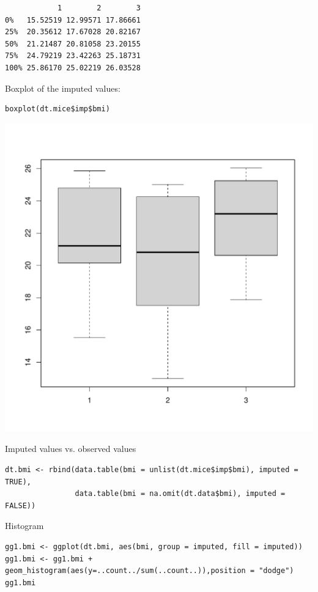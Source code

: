 \documentclass[12pt]{article}
\begin{document}
\begin{verbatim}
            1        2        3
0%   15.52519 12.99571 17.86661
25%  20.35612 17.67028 20.82167
50%  21.21487 20.81058 23.20155
75%  24.79219 23.42263 25.18731
100% 25.86170 25.02219 26.03528
\end{verbatim}

Boxplot of the imputed values:

\lstset{language=r,label= ,caption= ,captionpos=b,numbers=none}
\begin{lstlisting}
boxplot(dt.mice$imp$bmi)
\end{lstlisting}

\begin{center}
\includegraphics[width=.9\linewidth]{./boxplotImputed.pdf}
\end{center}

Imputed values vs. observed values
\lstset{language=r,label= ,caption= ,captionpos=b,numbers=none}
\begin{lstlisting}
dt.bmi <- rbind(data.table(bmi = unlist(dt.mice$imp$bmi), imputed = TRUE),
				data.table(bmi = na.omit(dt.data$bmi), imputed = FALSE))
\end{lstlisting}

Histogram
\lstset{language=r,label= ,caption= ,captionpos=b,numbers=none}
\begin{lstlisting}
gg1.bmi <- ggplot(dt.bmi, aes(bmi, group = imputed, fill = imputed))
gg1.bmi <- gg1.bmi + geom_histogram(aes(y=..count../sum(..count..)),position = "dodge")
gg1.bmi
\end{lstlisting}
\end{document}
